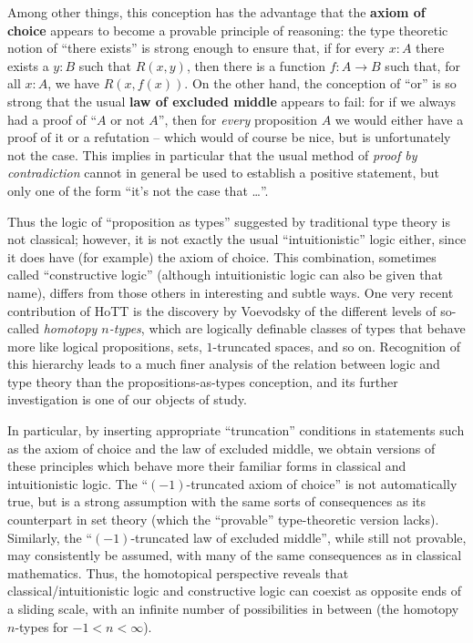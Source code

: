 {Among other things, this conception has the advantage that the {\bf axiom of choice} appears to become a provable principle of reasoning: the type theoretic notion of ``there exists'' is strong enough to ensure that, if for every $x: A$ there exists a $y:B$ such that $R(x,y)$, then there is a function $f : A\to B$ such that, for all $x:A$, we have $R(x, f(x))$.  On the other hand, the conception of ``or'' is so strong that the usual {\bf law of excluded middle} appears to fail: for if we always had a proof of ``$A$ or not $A$'', then for \emph{every} proposition $A$ we would either have a proof of it or a refutation -- which would of course be nice, but is unfortunately not the case.  This implies in particular that the usual method of \emph{proof by contradiction} cannot in general be used to establish a positive statement, but only one of the form ``it's not the case that \dots''.  

Thus the logic of ``proposition as types'' suggested by traditional type theory is not classical; however, it is not exactly the usual ``intuitionistic'' logic either, since it does have (for example) the axiom of choice.  This combination, sometimes called ``constructive logic'' (although intuitionistic logic can also be given that name), differs from those others in interesting and subtle ways.  One very recent contribution of HoTT is the discovery by Voevodsky of the different levels of so-called \emph{homotopy $n$-types}, which are logically definable classes of types that behave more like logical propositions, sets, $1$-truncated spaces, and so on.  Recognition of this hierarchy leads to a much finer analysis of the relation between logic and type theory than the propositions-as-types conception, and its further investigation is one of our objects of study.

In particular, by inserting appropriate ``truncation'' conditions in statements such as the axiom of choice and the law of excluded middle, we obtain versions of these principles which behave more their familiar forms in classical and intuitionistic logic.  The ``$(-1)$-truncated axiom of choice'' is not automatically true, but is a strong assumption with the same sorts of consequences as its counterpart in set theory (which the ``provable'' type-theoretic version lacks).  Similarly, the ``$(-1)$-truncated law of excluded middle'', while still not provable, may consistently be assumed, with many of the same consequences as in classical mathematics.  Thus, the homotopical perspective reveals that classical/intuitionistic logic and constructive logic can coexist as opposite ends of a sliding scale, with an infinite number of possibilities in between (the homotopy $n$-types for $-1 < n < \infty$).

}
